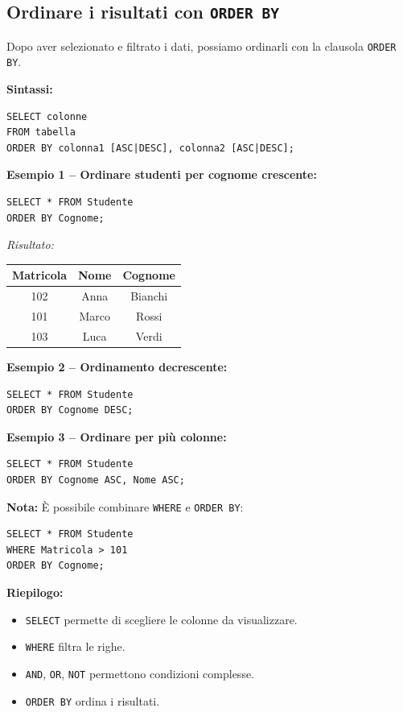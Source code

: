 \documentclass[a4paper,12pt]{article}
\newcommand{\code}[1]{\texttt{#1}}
\begin{document}
\subsection{Ordinare i risultati con \code{ORDER BY}}
Dopo aver selezionato e filtrato i dati, possiamo ordinarli con la clausola \code{ORDER BY}.

\textbf{Sintassi:}
\begin{verbatim}
SELECT colonne
FROM tabella
ORDER BY colonna1 [ASC|DESC], colonna2 [ASC|DESC];
\end{verbatim}

\textbf{Esempio 1 -- Ordinare studenti per cognome crescente:}
\begin{verbatim}
SELECT * FROM Studente
ORDER BY Cognome;
\end{verbatim}

\textit{Risultato:}
\begin{center}
\begin{tabular}{|c|c|c|}
\hline
Matricola & Nome & Cognome \\
\hline
102 & Anna & Bianchi \\
101 & Marco & Rossi \\
103 & Luca & Verdi \\
\hline
\end{tabular}
\end{center}

\textbf{Esempio 2 -- Ordinamento decrescente:}
\begin{verbatim}
SELECT * FROM Studente
ORDER BY Cognome DESC;
\end{verbatim}

\textbf{Esempio 3 -- Ordinare per più colonne:}
\begin{verbatim}
SELECT * FROM Studente
ORDER BY Cognome ASC, Nome ASC;
\end{verbatim}

\medskip
\textbf{Nota:} È possibile combinare \code{WHERE} e \code{ORDER BY}:
\begin{verbatim}
SELECT * FROM Studente
WHERE Matricola > 101
ORDER BY Cognome;
\end{verbatim}

\bigskip
\textbf{Riepilogo:}
\begin{itemize}
    \item \code{SELECT} permette di scegliere le colonne da visualizzare.
    \item \code{WHERE} filtra le righe.
    \item \code{AND}, \code{OR}, \code{NOT} permettono condizioni complesse.
    \item \code{ORDER BY} ordina i risultati.
\end{itemize}
\end{document}
